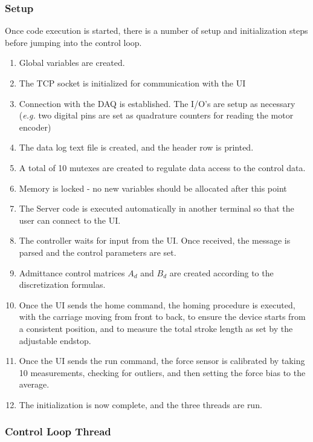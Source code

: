 \documentclass[12pt]{report}
\begin{document}
	\subsubsection{Setup}
	
	Once code execution is started, there is a number of setup and initialization steps before jumping into the control loop. 
	
	\begin{enumerate}
		\item Global variables are created. 		
		\item The TCP socket is initialized for communication with the UI
		\item Connection with the DAQ is established. The I/O's are setup as necessary (\textit{e.g.} two digital pins are set as quadrature counters for reading the motor encoder)
		\item The data log text file is created, and the header row is printed. 
		\item A total of 10 mutexes are created to regulate data access to the control data.
		\item Memory is locked - no new variables should be allocated after this point
		\item The Server code is executed automatically in another terminal so that the user can connect to the UI.
		\item The controller waits for input from the UI. Once received, the message is parsed and the control parameters are set. 
		\item Admittance control matrices $A_d$ and $B_d$ are created according to the discretization formulas.
		\item Once the UI sends the home command, the homing procedure is executed, with the carriage moving from front to back, to ensure the device starts from a consistent position, and to measure the total stroke length as set by the adjustable endstop. 
		\item Once the UI sends the run command, the force sensor is calibrated by taking 10 measurements, checking for outliers, and then setting the force bias to the average. 
		\item The initialization is now complete, and the three threads are run.
	\end{enumerate}
	
	
	\subsubsection{Control Loop Thread}
	
\end{document}
